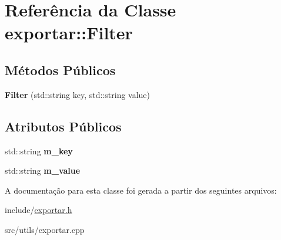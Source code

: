 \hypertarget{classexportar_1_1Filter}{}\section{Referência da Classe exportar\+:\+:Filter}
\label{classexportar_1_1Filter}
\subsection*{Métodos Públicos}
\begin{DoxyCompactItemize}
\item 
\mbox{\label{classexportar_1_1Filter_a1d55810de87c4dc292bdfbcf1e8a03e7}} 
{\bfseries Filter} (std\+::string key, std\+::string value)
\end{DoxyCompactItemize}
\subsection*{Atributos Públicos}
\begin{DoxyCompactItemize}
\item 
\mbox{\label{classexportar_1_1Filter_ac30091d21c49ea1d74791c8e1d0720c8}} 
std\+::string {\bfseries m\+\_\+key}
\item 
\mbox{\label{classexportar_1_1Filter_a44e98bc6bc1bdca3e315d34144636e00}} 
std\+::string {\bfseries m\+\_\+value}
\end{DoxyCompactItemize}


A documentação para esta classe foi gerada a partir dos seguintes arquivos\+:\begin{DoxyCompactItemize}
\item 
include/\hyperlink{exportar_8h}{exportar.\+h}\item 
src/utils/exportar.\+cpp\end{DoxyCompactItemize}
